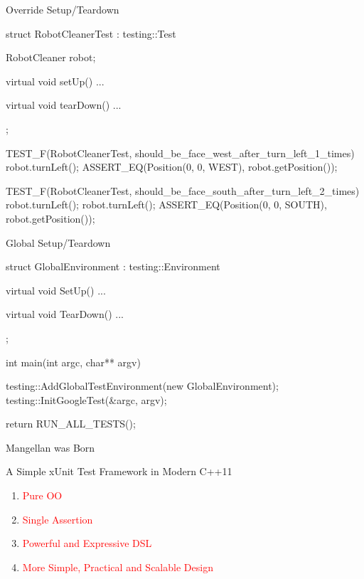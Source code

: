 \begin{frame}[fragile]{Override Setup/Teardown}
\begin{c++}
struct RobotCleanerTest : testing::Test
{
    RobotCleaner robot;

    virtual void setUp()
    { ... }

    virtual void tearDown()
    { ... }
};

TEST_F(RobotCleanerTest, should_be_face_west_after_turn_left_1_times)
{
    robot.turnLeft();
    ASSERT_EQ(Position(0, 0, WEST), robot.getPosition());
}

TEST_F(RobotCleanerTest, should_be_face_south_after_turn_left_2_times)
{
    robot.turnLeft();
    robot.turnLeft();
    ASSERT_EQ(Position(0, 0, SOUTH), robot.getPosition());
}
\end{c++}
\end{frame}

\begin{frame}[fragile]{Global Setup/Teardown}
\begin{c++}
struct GlobalEnvironment : testing::Environment
{
    virtual void SetUp()
    { ... }

    virtual void TearDown()
    { ... }
};

int main(int argc, char** argv)
{
    testing::AddGlobalTestEnvironment(new GlobalEnvironment);
    testing::InitGoogleTest(&argc, argv);

    return RUN_ALL_TESTS();
}
\end{c++}
\end{frame}

\begin{frame}[fragile]{Mangellan was Born}
\begin{block}{A Simple xUnit Test Framework in Modern C++11}
  \begin{enumerate}
    \item \textcolor{red}{Pure OO}
    \item \textcolor{red}{Single Assertion}
    \item \textcolor{red}{Powerful and Expressive DSL}
    \item \textcolor{red}{More Simple, Practical and Scalable Design}
  \end{enumerate}
\end{block}
\end{frame}

